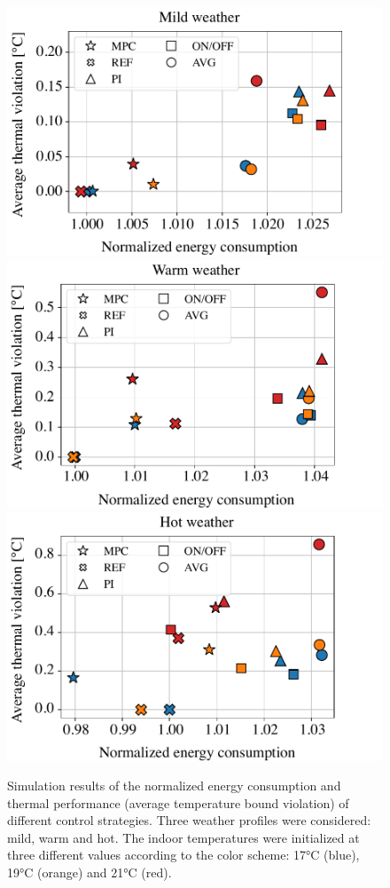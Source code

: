 \begin{figure}[!t]
	\centering
	\hspace{0pt}
	\includegraphics[width=0.55\linewidth]{../images/chap3_simres_mild.pdf} \\[12pt]
	\includegraphics[width=0.55\linewidth]{../images/chap3_simres_warm.pdf} \\[12pt]
	\includegraphics[width=0.55\linewidth]{../images/chap3_simres_hot.pdf} 
	\caption{Simulation results of the normalized energy consumption and thermal performance (average temperature bound violation) of different control strategies. Three weather profiles were considered: mild, warm and hot. The indoor temperatures were initialized at three different values according to the color scheme: 17°C (blue), 19°C (orange) and 21°C (red).} 
	\label{fig.powerRes}
\end{figure}

